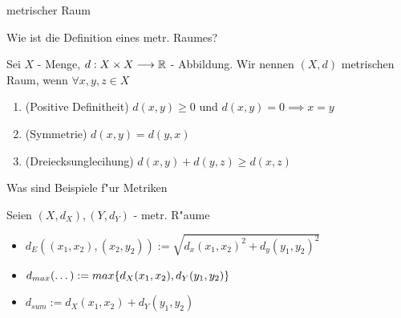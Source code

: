 \documentclass[class=article, crop=false]{standalone}
\begin{document}
\begin{zettel}{metrischer Raum}
\begin{flashcard}
\begin{question}
    Wie ist die Definition eines metr. Raumes?
\end{question}
\begin{definition}
    Sei $X$ - Menge, $d:X \times X \longrightarrow \mathbb{R}$ - Abbildung. Wir nennen $(X,d)$ metrischen Raum, wenn $\forall x,y,z \in X$ 
    \begin{enumerate}
        \item (Positive Definitheit) $d(x,y) \geq 0$ und $d(x,y)= 0 \implies x = y$ 
        \item (Symmetrie) $d(x,y) = d(y,x)$ 
        \item (Dreiecksunglecihung) $d(x,y) + d(y,z) \geq d(x,z)$ 
    \end{enumerate}
\end{definition}
\end{flashcard}

\begin{flashcard}
    \begin{question}
        Was sind Beispiele f"ur Metriken
    \end{question}
    \begin{example}[Metriken]
    Seien $ (X,d_X) , (Y,d_Y)  $ - metr. R"aume
    \begin{itemize}
        \item $d_E ( (x_1,x_2) , (x_2,y_2)) := \sqrt{d_x (x_1,x_2)^2 + d_y (y_1,y_2)^2  }$ 
        \item $d_{max} (\dots) := max \set{ d_X (x_1,x_2) , d_Y  (y_1,y_2) }$
        \item $d_{sum} := d_X (x_1,x_2) +  d_Y (y_1,y_2) $
    \end{itemize}
\end{example}    
\end{flashcard}


\end{zettel}
\end{document}
